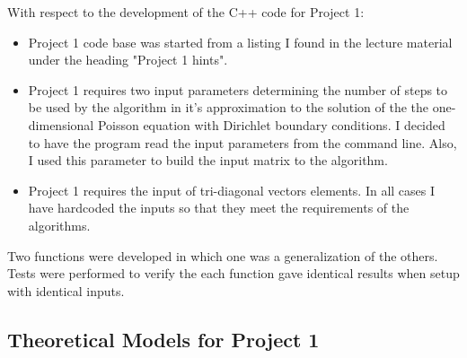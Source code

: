 \documentclass[11pt, oneside]{article}   	%
\begin{document}
With respect to the development of the C++ code for Project 1:
\begin{itemize}
\item Project 1 code base was started from a listing I found in the lecture material under the heading "Project 1 hints". 
\item Project 1 requires two input parameters determining the number of steps to be used by the algorithm in it's approximation  to the solution of the the one-dimensional Poisson equation with Dirichlet boundary conditions. I decided to have the program read the input parameters from the command line. Also, I used this parameter to build the input matrix to the algorithm.
\item Project 1 requires the input of tri-diagonal vectors elements. In all cases I have hardcoded the inputs so that they meet the requirements of the algorithms.
\end{itemize} Two functions were developed in which  one was a generalization of the others. Tests were performed to verify the each function gave identical results when setup with identical inputs.
\subsection{Theoretical Models for Project 1}
\end{document}
